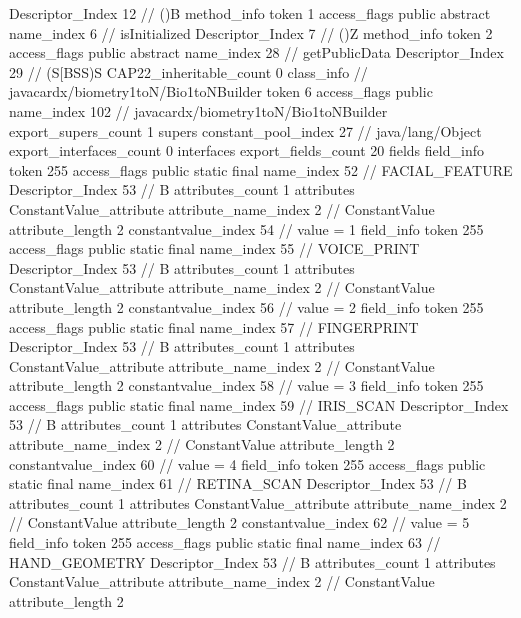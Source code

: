 {{{{{					Descriptor_Index	12		// ()B
				}
				method_info {
					token	1
					access_flags	public abstract
					name_index	6		// isInitialized
					Descriptor_Index	7		// ()Z
				}
				method_info {
					token	2
					access_flags	public abstract
					name_index	28		// getPublicData
					Descriptor_Index	29		// (S[BSS)S
				}
			}
			CAP22_inheritable_count	0
		}
		class_info {		// javacardx/biometry1toN/Bio1toNBuilder
			token	6
			access_flags	public
			name_index	102		// javacardx/biometry1toN/Bio1toNBuilder
			export_supers_count	1
			supers {
				constant_pool_index	27		// java/lang/Object
			}
			export_interfaces_count	0
			interfaces {
			}
			export_fields_count	20
			fields {
			field_info {
				token	255
				access_flags	public static final
				name_index	52		// FACIAL_FEATURE
				Descriptor_Index	53		// B
				attributes_count	1
				attributes {
				ConstantValue_attribute {
					attribute_name_index	2		// ConstantValue
					attribute_length	2
					constantvalue_index	54		// value = 1
				}
				}
			}
			field_info {
				token	255
				access_flags	public static final
				name_index	55		// VOICE_PRINT
				Descriptor_Index	53		// B
				attributes_count	1
				attributes {
				ConstantValue_attribute {
					attribute_name_index	2		// ConstantValue
					attribute_length	2
					constantvalue_index	56		// value = 2
				}
				}
			}
			field_info {
				token	255
				access_flags	public static final
				name_index	57		// FINGERPRINT
				Descriptor_Index	53		// B
				attributes_count	1
				attributes {
				ConstantValue_attribute {
					attribute_name_index	2		// ConstantValue
					attribute_length	2
					constantvalue_index	58		// value = 3
				}
				}
			}
			field_info {
				token	255
				access_flags	public static final
				name_index	59		// IRIS_SCAN
				Descriptor_Index	53		// B
				attributes_count	1
				attributes {
				ConstantValue_attribute {
					attribute_name_index	2		// ConstantValue
					attribute_length	2
					constantvalue_index	60		// value = 4
				}
				}
			}
			field_info {
				token	255
				access_flags	public static final
				name_index	61		// RETINA_SCAN
				Descriptor_Index	53		// B
				attributes_count	1
				attributes {
				ConstantValue_attribute {
					attribute_name_index	2		// ConstantValue
					attribute_length	2
					constantvalue_index	62		// value = 5
				}
				}
			}
			field_info {
				token	255
				access_flags	public static final
				name_index	63		// HAND_GEOMETRY
				Descriptor_Index	53		// B
				attributes_count	1
				attributes {
				ConstantValue_attribute {
					attribute_name_index	2		// ConstantValue
					attribute_length	2
}}}}}}}

